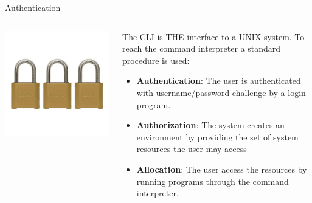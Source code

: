 \documentclass[unknownkeysallowed, 10pt, a4 paper, handout]{beamer}
\begin{document}
\begin{frame}[label=login]{Authentication}
  \begin{columns}[T]
    \begin{column}{.23\textwidth}
      \begin{center}
        \includegraphics[scale=0.25]{pics/locks.png}
      \end{center}
    \end{column}
    \hfill
    \begin{column}{.66\textwidth}
    \small{
      The CLI is THE interface to a UNIX system. To reach the command
      interpreter a standard procedure is used:
      \begin{itemize}
        \item \textbf{Authentication}: The user is authenticated with
          username/password challenge by a login program.
        \item \textbf{Authorization}: The system creates an environment
          by providing the set of system resources the user may access 
        \item \textbf{Allocation}: The user access the resources by
          running programs through the command interpreter.
      \end{itemize}
      }
    \end{column}
  \end{columns}
\end{frame}
\end{document}
